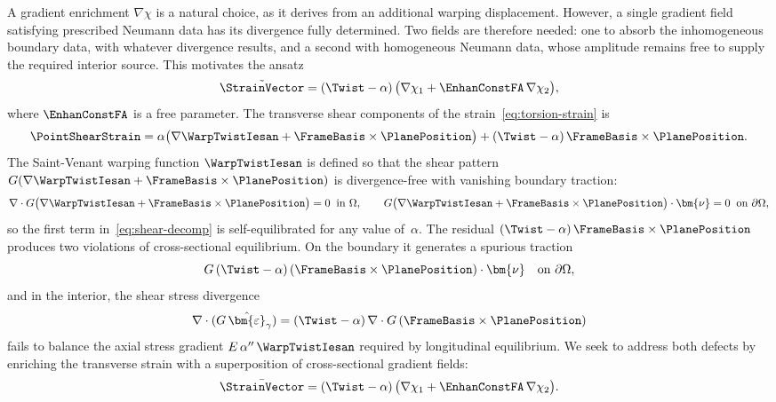 A gradient enrichment $\nabla\chi$ is a natural choice,
as it derives from an additional warping displacement. 
However, a single
gradient field satisfying prescribed Neumann data has its divergence fully
determined. 
Two fields are therefore needed: one to absorb the inhomogeneous
boundary data, with whatever divergence results, and a second with homogeneous
Neumann data, whose amplitude remains free to supply the required interior source. 
This motivates the ansatz
\begin{equation}
  \tilde{\StrainVector}
  = (\Twist - \alpha)\,
    \bigl(\nabla\chi_1
    + \EnhanConstFA\,\nabla\chi_2\bigr),
  \label{eq:enhan-ansatz}
\end{equation}
where $\EnhanConstFA$ is a free parameter. 
The transverse shear components of the 
strain~\eqref{eq:torsion-strain} is
\begin{equation}
  \PointShearStrain %
  = \alpha\bigl(\nabla\WarpTwistIesan + \FrameBasis\times\PlanePosition\bigr)
  + (\Twist - \alpha)\,\FrameBasis\times\PlanePosition.
  \label{eq:shear-decomp}
\end{equation}
The Saint-Venant warping function $\WarpTwistIesan$ is defined so that the shear pattern
$G(\nabla\WarpTwistIesan + \FrameBasis\times\PlanePosition)$ is divergence-free with
vanishing boundary traction:
\begin{equation}
  \nabla\cdot G\bigl(\nabla\WarpTwistIesan
    + \FrameBasis\times\PlanePosition\bigr) = 0
  \;\;\text{in }\Omega, \qquad
  G\bigl(\nabla\WarpTwistIesan
    + \FrameBasis\times\PlanePosition\bigr)\cdot\bm{\nu} = 0
  \;\;\text{on }\partial\Omega,
  \label{eq:sv-bvp}
\end{equation}
so the first term in~\eqref{eq:shear-decomp} is self-equilibrated for any value
of~$\alpha$. 
The residual
$(\Twist - \alpha)\,\FrameBasis\times\PlanePosition$ produces two violations of
cross-sectional equilibrium. 
On the boundary it generates a spurious traction
\begin{equation}
  G\,(\Twist - \alpha)\,
  (\FrameBasis\times\PlanePosition)\cdot\bm{\nu}
  \quad\text{on }\partial\Omega,
  \label{eq:torsion-violation}
\end{equation}
and in the interior, the shear stress divergence
\begin{equation}
  \nabla\cdot(G\,\hat{\bm{\varepsilon}}_{\gamma})
  = (\Twist - \alpha)\,
    \nabla\cdot G\,(\FrameBasis\times\PlanePosition)
  \label{eq:divergence-violation}
\end{equation}
fails to balance the axial stress gradient $E\,\alpha''\,\WarpTwistIesan$ required by
longitudinal equilibrium. 
We seek to address both defects by enriching the
transverse strain with a superposition of cross-sectional gradient fields:
\begin{equation}
  \bar{\StrainVector}
  = (\Twist - \alpha)\,
    \bigl(\nabla\chi_1 + \EnhanConstFA\,\nabla\chi_2\bigr).
\end{equation}

